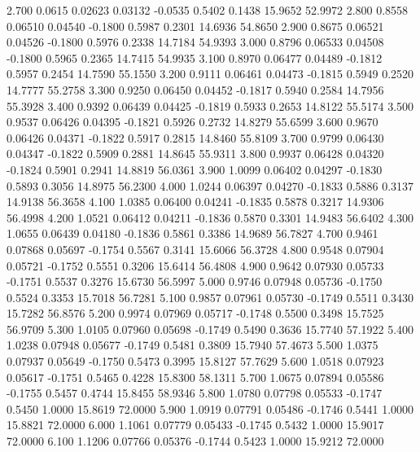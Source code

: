    2.700   0.0615   0.02623   0.03132  -0.0535   0.5402   0.1438  15.9652  52.9972
   2.800   0.8558   0.06510   0.04540  -0.1800   0.5987   0.2301  14.6936  54.8650
   2.900   0.8675   0.06521   0.04526  -0.1800   0.5976   0.2338  14.7184  54.9393
   3.000   0.8796   0.06533   0.04508  -0.1800   0.5965   0.2365  14.7415  54.9935
   3.100   0.8970   0.06477   0.04489  -0.1812   0.5957   0.2454  14.7590  55.1550
   3.200   0.9111   0.06461   0.04473  -0.1815   0.5949   0.2520  14.7777  55.2758
   3.300   0.9250   0.06450   0.04452  -0.1817   0.5940   0.2584  14.7956  55.3928
   3.400   0.9392   0.06439   0.04425  -0.1819   0.5933   0.2653  14.8122  55.5174
   3.500   0.9537   0.06426   0.04395  -0.1821   0.5926   0.2732  14.8279  55.6599
   3.600   0.9670   0.06426   0.04371  -0.1822   0.5917   0.2815  14.8460  55.8109
   3.700   0.9799   0.06430   0.04347  -0.1822   0.5909   0.2881  14.8645  55.9311
   3.800   0.9937   0.06428   0.04320  -0.1824   0.5901   0.2941  14.8819  56.0361
   3.900   1.0099   0.06402   0.04297  -0.1830   0.5893   0.3056  14.8975  56.2300
   4.000   1.0244   0.06397   0.04270  -0.1833   0.5886   0.3137  14.9138  56.3658
   4.100   1.0385   0.06400   0.04241  -0.1835   0.5878   0.3217  14.9306  56.4998
   4.200   1.0521   0.06412   0.04211  -0.1836   0.5870   0.3301  14.9483  56.6402
   4.300   1.0655   0.06439   0.04180  -0.1836   0.5861   0.3386  14.9689  56.7827
   4.700   0.9461   0.07868   0.05697  -0.1754   0.5567   0.3141  15.6066  56.3728
   4.800   0.9548   0.07904   0.05721  -0.1752   0.5551   0.3206  15.6414  56.4808
   4.900   0.9642   0.07930   0.05733  -0.1751   0.5537   0.3276  15.6730  56.5997
   5.000   0.9746   0.07948   0.05736  -0.1750   0.5524   0.3353  15.7018  56.7281
   5.100   0.9857   0.07961   0.05730  -0.1749   0.5511   0.3430  15.7282  56.8576
   5.200   0.9974   0.07969   0.05717  -0.1748   0.5500   0.3498  15.7525  56.9709
   5.300   1.0105   0.07960   0.05698  -0.1749   0.5490   0.3636  15.7740  57.1922
   5.400   1.0238   0.07948   0.05677  -0.1749   0.5481   0.3809  15.7940  57.4673
   5.500   1.0375   0.07937   0.05649  -0.1750   0.5473   0.3995  15.8127  57.7629
   5.600   1.0518   0.07923   0.05617  -0.1751   0.5465   0.4228  15.8300  58.1311
   5.700   1.0675   0.07894   0.05586  -0.1755   0.5457   0.4744  15.8455  58.9346
   5.800   1.0780   0.07798   0.05533  -0.1747   0.5450   1.0000  15.8619  72.0000
   5.900   1.0919   0.07791   0.05486  -0.1746   0.5441   1.0000  15.8821  72.0000
   6.000   1.1061   0.07779   0.05433  -0.1745   0.5432   1.0000  15.9017  72.0000
   6.100   1.1206   0.07766   0.05376  -0.1744   0.5423   1.0000  15.9212  72.0000
